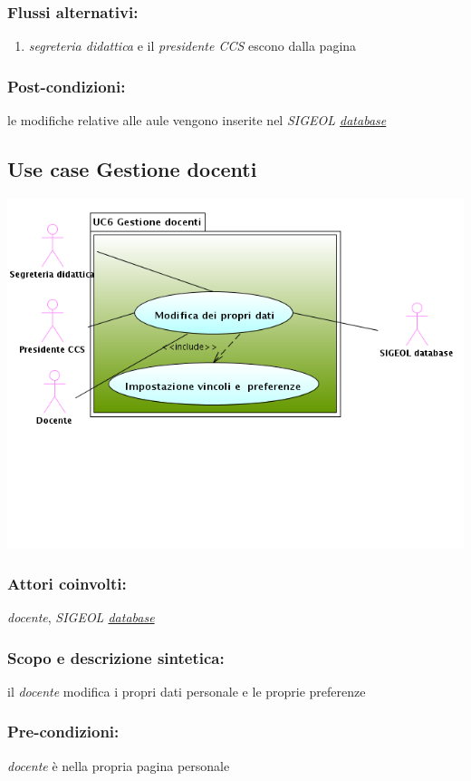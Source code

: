 \documentclass[11pt,a4paper]{article}
\begin{document}
\subsubsection*{Flussi alternativi:}
\begin{enumerate} 
\item \textit{segreteria didattica} e il \textit{presidente CCS} escono dalla pagina
\end{enumerate}
\subsubsection*{Post-condizioni:}
le modifiche relative alle aule vengono inserite nel \textit{SIGEOL \underline{database}}
\subsection{Use case Gestione docenti}
\begin{center} 
 \includegraphics[scale=0.5]{images/UseCaseGestioneDocenti.png}
\end{center}
\subsubsection*{Attori coinvolti:}
\textit{docente}, \textit{SIGEOL \underline{database}}
\subsubsection*{Scopo e descrizione sintetica:}
il \textit{docente} modifica i propri dati personale e le proprie preferenze
\subsubsection*{Pre-condizioni:}
\textit{docente} è nella propria pagina personale
\end{document}
